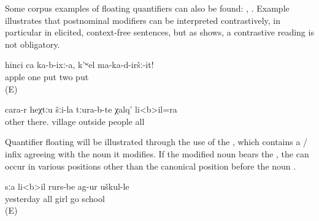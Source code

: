 Some corpus examples of floating quantifiers can also be found: , . Example  illustrates that postnominal modifiers can be interpreted contrastively, in particular in elicited, context-free sentences, but as  shows, a contrastive reading is not obligatory. 

\begin{exe}
		\ex	\label{ex:‎‎‎Put one apple (there), do not put two (apples)}
	\gll	hinci	ca	ka-b-ixː-a,	k'ʷel	ma-ka-d-iršː-it!\\
		apple	one	put	two	put\\
	\glt	{} (E)
	
	\ex	\label{ex:and all the people from the other villages down there}
	\gll	cara-r	heχtːu	šːi-la	tːura-b-te	χalq'	li<b>il=ra\\
		other	there.	village	outside 	people	all\\
	\glt	{}
	
\end{exe}

Quantifier floating will be illustrated through the use of the  , which contains a / infix agreeing with the noun it modifies. If the modified noun bears the , the  can occur in various positions other than the canonical position before the noun . 


%
\begin{exe}
	\ex	\label{ex:Yesterday all girls went to school}
	\begin{xlist}
		\ex	\label{ex:Yesterday all girls went to school@A}
		\gll	sːa	li<b>il	rurs-be	ag-ur	uškul-le\\
			yesterday	all	girl	go	school\\
		\glt	{} (E)

		\ex	{}	\label{ex:Yesterday all girls went to school@B}

		\ex	{}	\label{ex:Yesterday all girls went to school@C}

		\ex	{}	\label{ex:Yesterday all girls went to school@D}

	\end{xlist}
\end{exe}

